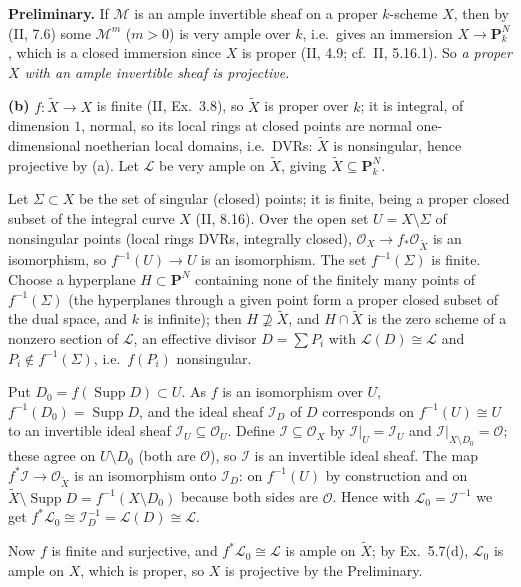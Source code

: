 \documentclass[11pt]{article}
\begin{document}
\textbf{Preliminary.} If $\mathcal M$ is an ample invertible sheaf on a proper $k$-scheme $X$, then by (II, 7.6) some $\mathcal M^m$ ($m>0$) is very ample over $k$, i.e.\ gives an immersion $X\to\mathbf P^N_k$, which is a closed immersion since $X$ is proper (II, 4.9; cf.\ II, 5.16.1). So \emph{a proper $X$ with an ample invertible sheaf is projective.}

\textbf{(b)} $f\colon\tilde X\to X$ is finite (II, Ex.~3.8), so $\tilde X$ is proper over $k$; it is integral, of dimension $1$, normal, so its local rings at closed points are normal one-dimensional noetherian local domains, i.e.\ DVRs: $\tilde X$ is nonsingular, hence projective by (a). Let $\mathcal L$ be very ample on $\tilde X$, giving $\tilde X\subseteq\mathbf P^N_k$.

Let $\Sigma\subset X$ be the set of singular (closed) points; it is finite, being a proper closed subset of the integral curve $X$ (II, 8.16). Over the open set $U=X\setminus\Sigma$ of nonsingular points (local rings DVRs, integrally closed), $\mathcal O_X\to f_*\mathcal O_{\tilde X}$ is an isomorphism, so $f^{-1}(U)\to U$ is an isomorphism. The set $f^{-1}(\Sigma)$ is finite. Choose a hyperplane $H\subset\mathbf P^N$ containing none of the finitely many points of $f^{-1}(\Sigma)$ (the hyperplanes through a given point form a proper closed subset of the dual space, and $k$ is infinite); then $H\not\supseteq\tilde X$, and $H\cap\tilde X$ is the zero scheme of a nonzero section of $\mathcal L$, an effective divisor $D=\sum P_i$ with $\mathcal L(D)\cong\mathcal L$ and $P_i\notin f^{-1}(\Sigma)$, i.e.\ $f(P_i)$ nonsingular.

Put $D_0=f(\operatorname{Supp}D)\subset U$. As $f$ is an isomorphism over $U$, $f^{-1}(D_0)=\operatorname{Supp}D$, and the ideal sheaf $\mathcal I_D$ of $D$ corresponds on $f^{-1}(U)\cong U$ to an invertible ideal sheaf $\mathcal I_U\subseteq\mathcal O_U$. Define $\mathcal I\subseteq\mathcal O_X$ by $\mathcal I|_U=\mathcal I_U$ and $\mathcal I|_{X\setminus D_0}=\mathcal O$; these agree on $U\setminus D_0$ (both are $\mathcal O$), so $\mathcal I$ is an invertible ideal sheaf. The map $f^*\mathcal I\to\mathcal O_{\tilde X}$ is an isomorphism onto $\mathcal I_D$: on $f^{-1}(U)$ by construction and on $\tilde X\setminus\operatorname{Supp}D=f^{-1}(X\setminus D_0)$ because both sides are $\mathcal O$. Hence with $\mathcal L_0=\mathcal I^{-1}$ we get $f^*\mathcal L_0\cong\mathcal I_D^{-1}=\mathcal L(D)\cong\mathcal L$.

Now $f$ is finite and surjective, and $f^*\mathcal L_0\cong\mathcal L$ is ample on $\tilde X$; by Ex.~5.7(d), $\mathcal L_0$ is ample on $X$, which is proper, so $X$ is projective by the Preliminary.
\end{document}
